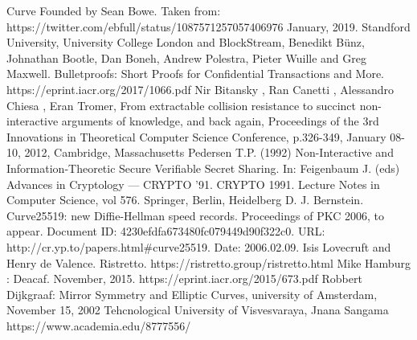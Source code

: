 \documentclass[letterpaper, 10 pt, conference]{ieeeconf}  %
\begin{document}
\newpage



\addtolength{\textheight}{-12cm}   %



\begin{thebibliography}{99}

 Curve Founded by Sean Bowe. Taken from: https://twitter.com/ebfull/status/1087571257057406976 January, 2019.
 Standford University, University College London and BlockStream, Benedikt Bünz, Johnathan Bootle, Dan Boneh, Andrew Polestra, Pieter Wuille and Greg Maxwell. Bulletproofs: Short Proofs for Confidential Transactions and More.\\ https://eprint.iacr.org/2017/1066.pdf
 Nir Bitansky , Ran Canetti , Alessandro Chiesa , Eran Tromer, From extractable collision resistance to succinct non-interactive arguments of knowledge, and back again, Proceedings of the 3rd Innovations in Theoretical Computer Science Conference, p.326-349, January 08-10, 2012, Cambridge, Massachusetts
 Pedersen T.P. (1992) Non-Interactive and Information-Theoretic Secure Verifiable Secret Sharing. In: Feigenbaum J. (eds) Advances in Cryptology — CRYPTO ’91. CRYPTO 1991. Lecture Notes in Computer Science, vol 576. Springer, Berlin, Heidelberg
 D. J. Bernstein. Curve25519: new Diffie-Hellman speed records. Proceedings of PKC 2006, to appear. Document ID: 4230efdfa673480fc079449d90f322c0. URL: http://cr.yp.to/papers.html\#curve25519. Date: 2006.02.09.
 Isis Lovecruft and Henry de Valence. Ristretto. https://ristretto.group/ristretto.html
 Mike Hamburg : Deacaf. November, 2015. https://eprint.iacr.org/2015/673.pdf
Robbert Dijkgraaf: Mirror Symmetry and Elliptic Curves, university of Amsterdam, November 15, 2002
 Tehcnological University of Visvesvaraya, Jnana Sangama https://www.academia.edu/8777556/

\end{thebibliography}
\end{document}
